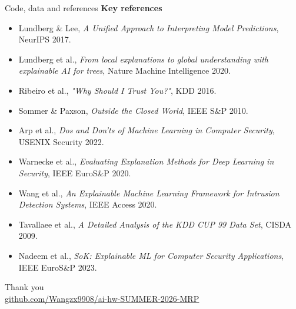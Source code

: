 \documentclass[10pt,aspectratio=169]{beamer}
\newcommand{\link}[2]{\href{#1}{\color{accent}\underline{#2}}}
\begin{document}
\begin{frame}{Code, data and references}
\vspace{0.5em}
\normalsize\textbf{Key references}
\scriptsize
\begin{itemize}\itemsep0pt
  \item Lundberg \& Lee, \emph{A Unified Approach to Interpreting Model Predictions}, NeurIPS 2017.
  \item Lundberg et al., \emph{From local explanations to global understanding with explainable AI for trees}, Nature Machine Intelligence 2020.
  \item Ribeiro et al., \emph{"Why Should I Trust You?"}, KDD 2016.
  \item Sommer \& Paxson, \emph{Outside the Closed World}, IEEE S\&P 2010.
  \item Arp et al., \emph{Dos and Don'ts of Machine Learning in Computer Security}, USENIX Security 2022.
  \item Warnecke et al., \emph{Evaluating Explanation Methods for Deep Learning in Security}, IEEE EuroS\&P 2020.
  \item Wang et al., \emph{An Explainable Machine Learning Framework for Intrusion Detection Systems}, IEEE Access 2020.
  \item Tavallaee et al., \emph{A Detailed Analysis of the KDD CUP 99 Data Set}, CISDA 2009.
  \item Nadeem et al., \emph{SoK: Explainable ML for Computer Security Applications}, IEEE EuroS\&P 2023.
\end{itemize}
\end{frame}

{
\begin{frame}[plain]
\vfill
\centering
{\Large Thank you}\\[0.8em]
\small\link{https://github.com/Wangzx9908/ai-hw-SUMMER-2026-MRP}{github.com/Wangzx9908/ai-hw-SUMMER-2026-MRP}
\vfill
\end{frame}}
\end{document}
